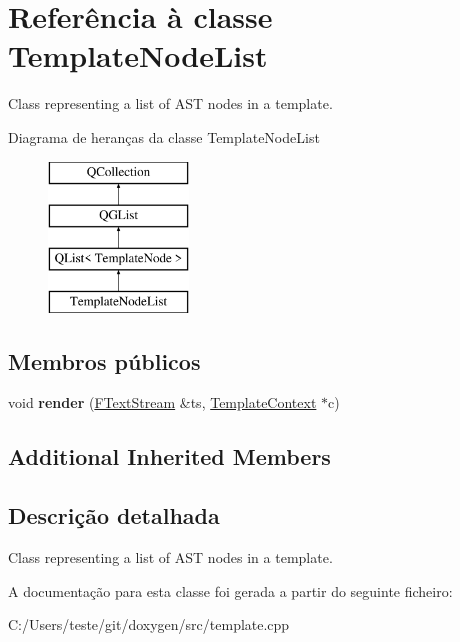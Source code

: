 \hypertarget{class_template_node_list}{\section{Referência à classe Template\-Node\-List}
\label{class_template_node_list}
}


Class representing a list of A\-S\-T nodes in a template.  


Diagrama de heranças da classe Template\-Node\-List\begin{figure}[H]
\begin{center}
\leavevmode
\includegraphics[height=4.000000cm]{class_template_node_list}
\end{center}
\end{figure}
\subsection*{Membros públicos}
\begin{DoxyCompactItemize}
\item 
\hypertarget{class_template_node_list_aaa6575d8c79eeaa49f849f1ca1d6b228}{void {\bfseries render} (\hyperlink{class_f_text_stream}{F\-Text\-Stream} \&ts, \hyperlink{class_template_context}{Template\-Context} $\ast$c)}\label{class_template_node_list_aaa6575d8c79eeaa49f849f1ca1d6b228}

\end{DoxyCompactItemize}
\subsection*{Additional Inherited Members}


\subsection{Descrição detalhada}
Class representing a list of A\-S\-T nodes in a template. 

A documentação para esta classe foi gerada a partir do seguinte ficheiro\-:\begin{DoxyCompactItemize}
\item 
C\-:/\-Users/teste/git/doxygen/src/template.\-cpp\end{DoxyCompactItemize}
